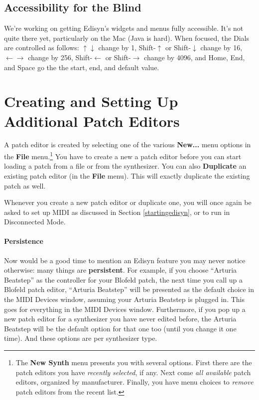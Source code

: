 \documentclass{article}
\begin{document}
\subsection{Accessibility for the Blind} We're working on getting Edisyn's widgets and menus fully accessible.  It's not quite there yet, particularly on the Mac (Java is hard).  When focused, the Dials are controlled as follows:  \(\uparrow \downarrow\) change by 1, Shift-\(\uparrow\) or Shift-\(\downarrow\) change by 16, \(\leftarrow \rightarrow\) change by 256, Shift-\(\leftarrow\) or Shift-\(\rightarrow\) change by 4096, and Home, End, and Space go the the start, end, and default value.  %

\section{Creating and Setting Up Additional Patch Editors}

A patch editor is created by selecting one of the various {\bf New...} menu options in the {\bf File} menu.\footnote{The {\bf New Synth} menu presents you with several options.  First there are the patch editors you have {\it recently selected}, if any.  Next come {\it all available} patch editors, organized by manufacturer.  Finally, you have menu choices to {\it remove} patch editors from the recent list.}   You have to create a new a patch editor before you can start loading a patch from a file or from the synthesizer.  You can also {\bf Duplicate} an existing patch editor (in the {\bf File} menu).  This will exactly duplicate the existing patch as well.  

Whenever you create a new patch editor or duplicate one, you will once again be asked to set up MIDI as discussed in Section \ref{startingedisyn}, or to run in Disconnected Mode.

\paragraph{Persistence}
Now would be a good time to mention an Edisyn feature you may never notice otherwise: many things are {\bf persistent}.  For example, if you choose ``Arturia Beatstep'' as the controller for your Blofeld patch, the next time you call up a Blofeld patch editor, ``Arturia Beatstep'' will be presented as the default choice in the MIDI Devices window, assuming your Arturia Beatstep is plugged in.  This goes for everything in the MIDI Devices window.  Furthermore, if you pop up a new patch editor for a synthesizer you have never edited before, the Arturia Beatstep will be the default option for that one too (until you change it one time).    And these options are per synthesizer type.
\end{document}
